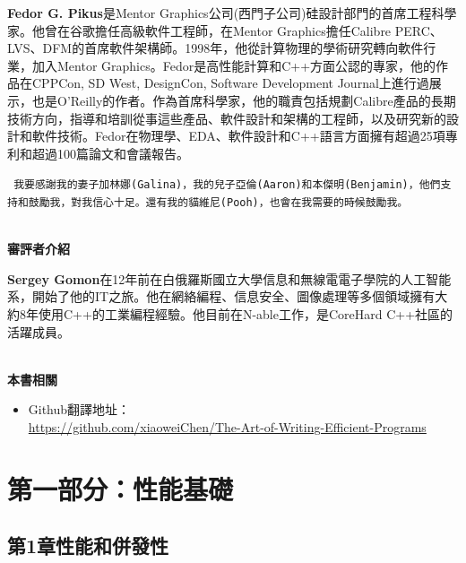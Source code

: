 \documentclass[11pt,a4paper,UTF8]{book}
\begin{document}
\textbf{Fedor G. Pikus}是Mentor Graphics公司(西門子公司)硅設計部門的首席工程科學家。他曾在谷歌擔任高級軟件工程師，在Mentor Graphics擔任Calibre PERC、LVS、DFM的首席軟件架構師。1998年，他從計算物理的學術研究轉向軟件行業，加入Mentor Graphics。Fedor是高性能計算和C++方面公認的專家，他的作品在CPPCon, SD West, DesignCon, Software Development Journal上進行過展示，也是O'Reilly的作者。作為首席科學家，他的職責包括規劃Calibre產品的長期技術方向，指導和培訓從事這些產品、軟件設計和架構的工程師，以及研究新的設計和軟件技術。Fedor在物理學、EDA、軟件設計和C++語言方面擁有超過25項專利和超過100篇論文和會議報告。
\begin{center}
\tt
我要感謝我的妻子加林娜(Galina)，我的兒子亞倫(Aaron)和本傑明(Benjamin)，他們支持和鼓勵我，對我信心十足。還有我的貓維尼(Pooh)，也會在我需要的時候鼓勵我。
\end{center}

\thispagestyle{empty}
\hspace*{\fill} \\ %
\noindent\textbf{審評者介紹}

\textbf{Sergey Gomon}在12年前在白俄羅斯國立大學信息和無線電電子學院的人工智能系，開始了他的IT之旅。他在網絡編程、信息安全、圖像處理等多個領域擁有大約8年使用C++的工業編程經驗。他目前在N-able工作，是CoreHard C++社區的活躍成員。


\hspace*{\fill} \\ %
\noindent\textbf{本書相關}
\begin{itemize}
\item Github翻譯地址：\\\url{https://github.com/xiaoweiChen/The-Art-of-Writing-Efficient-Programs}
\end{itemize}
\newpage

\pagestyle{empty}


\tableofcontents
\newpage


\color{white}
\section*{第一部分：性能基礎}
\pagecolor{mygray}
\textbf{}
\newpage
\color{black}
\pagecolor{white}

\subsection*{ 第1章\hspace{0.5cm}性能和併發性}

\end{document}
